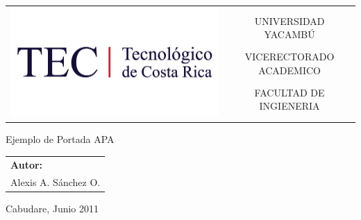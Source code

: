 \documentclass[a4paper,10pt]{book}
\title{\Titulo}
\author{\Autor}
\newcommand{\Titulo}{Ejemplo de Portada APA}
\newcommand{\Autor}{Alexis A. Sánchez O.}
\begin{document}
\begin{tabular*}{0.8\textwidth}{@{\extracolsep{\fill}} cc }
\multirow{6}{*}{\includegraphics[width=1\textwidth]{logo-tec}}
& \\
& UNIVERSIDAD YACAMBÚ \\
& VICERECTORADO ACADEMICO \\
& FACULTAD DE INGIENERIA \\
& \\
\end{tabular*}
\vspace{9cm}
\begin{center}
\Titulo\\
\end{center}
\vspace{9cm}
\raggedleft
\begin{tabular}{l}
\textbf{Autor:}\\
\Autor
\end{tabular}
\vspace{1cm}
\begin{center}
Cabudare, Junio 2011\\
\end{center}
\end{document}
